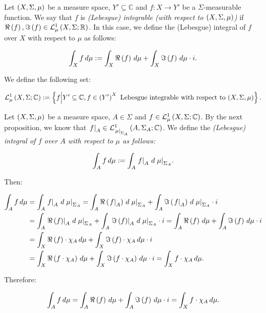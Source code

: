 \begin{definition}
  Let $\pr{X,\Sigma,\mu}$ be a measure space, $Y'\subseteq\mathbb{C}$ and $f:X\rightarrow Y'$ be a $\Sigma$-measurable function. We say that $f$ is \emph{(Lebesgue) integrable (with respect to $\pr{X,\Sigma,\mu}$)} if $\Re\pr{f},\Im\pr{f}\in\LebR{X}{\Sigma}{\mu}$. In this case, we define the {(Lebesgue) integral of $f$ over $X$ with respect to $\mu$} as follows:

  \begin{equation}
    \int_{X}{f\,d\mu}:=\int_{X}{\Re\pr{f}\,d\mu}+\int_{X}{\Im\pr{f}\,d\mu}\cdot i.
  \end{equation}

  We define the following set:
  
  \begin{equation}
      \LebC{X}{\Sigma}{\mu}:=\set{f\middle|Y'\subseteq\mathbb{C},f\in\pr{Y'}^{X}\text{ Lebesgue integrable with respect to $\pr{X,\Sigma,\mu}$}}.
  \end{equation}
\end{definition}

\begin{remark}
  Let $\pr{X,\Sigma,\mu}$ be a measure space, $A\in\Sigma$ and $f\in\LebC{X}{\Sigma}{\mu}$. By the next proposition, we know that $\rest{f}{A}\in\LebC{A}{\Sigma_A}{\rest{\mu}{\Sigma_A}}$. We define the \emph{(Lebesgue) integral of $f$ over $A$ with respect to $\mu$ as follows:}

  \begin{equation}
    \int_{A}{f\,d\mu}:=\int_{A}{\rest{f}{A}\,d\rest{\mu}{\Sigma_A}}.
  \end{equation}

  Then:

  \begin{equation}
    \begin{split}
      \int_{A}{f\,d\mu} & =\int_{A}{\rest{f}{A}\,d\rest{\mu}{\Sigma_A}}=\int_{A}{\Re\pr{\rest{f}{A}}\,d\rest{\mu}{\Sigma_A}}+\int_{A}{\Im\pr{\rest{f}{A}}\,d\rest{\mu}{\Sigma_A}}\cdot i\\
      & =\int_{A}{\rest{\Re\pr{f}}{A}\,d\rest{\mu}{\Sigma_A}}+\int_{A}{\rest{\Im\pr{f}}{A}\,d\rest{\mu}{\Sigma_A}}\cdot i=\int_{A}{\Re\pr{f}\,d\mu}+\int_{A}{\Im\pr{f}\,d\mu}\cdot i\\
      & =\int_{X}{\Re\pr{f}\cdot\chi_A\,d\mu}+\int_{X}{\Im\pr{f}\cdot\chi_A\,d\mu}\cdot i\\
      &=\int_{X}{\Re\pr{f\cdot\chi_A}\,d\mu}+\int_{X}{\Im\pr{f\cdot\chi_A}\,d\mu}\cdot i=\int_{X}{f\cdot\chi_A\,d\mu}.
    \end{split}
  \end{equation}

  Therefore:

  \begin{equation}
    \int_{A}{f\,d\mu}=\int_{A}{\Re\pr{f}\,d\mu}+\int_{A}{\Im\pr{f}\,d\mu}\cdot i=\int_{X}{f\cdot\chi_A\,d\mu}.
  \end{equation}
\end{remark}

